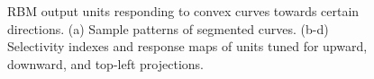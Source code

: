 \documentclass[twocolumn]{article}
\begin{document}
\begin{figure}[!t]
\centering
{}\hfil
{}\hfil
{}\hfil
{}
\caption{RBM output units responding to convex curves towards certain directions.
(a) Sample patterns of segmented curves.
(b-d) Selectivity indexes and response maps of units tuned for upward, downward, and top-left projections. }
\label{fig:8}
\end{figure}
\end{document}
